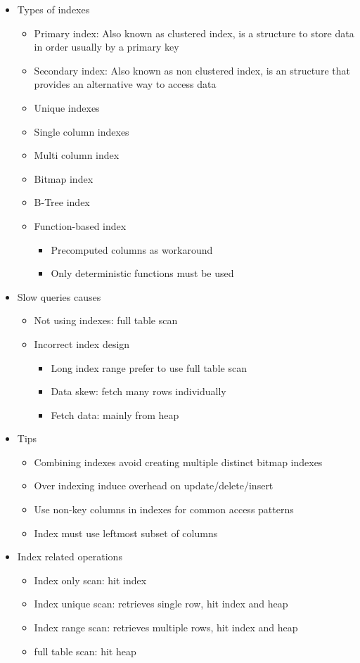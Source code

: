\documentclass[../../main.tex]{subfiles}
\begin{document}
\begin{itemize}
    \item Types of indexes
    \begin{itemize}
        \item Primary index: Also known as clustered index, is a structure to store data in order usually by a primary key
        \item Secondary index: Also known as non clustered index, is an structure that provides an alternative way to access data
        \item Unique indexes
        \item Single column indexes
        \item Multi column index
        \item Bitmap index
        \item B-Tree index
        \item Function-based index
        \begin{itemize}
            \item Precomputed columns as workaround
            \item Only deterministic functions must be used
        \end{itemize}
    \end{itemize}
    \item Slow queries causes
    \begin{itemize}
        \item Not using indexes: full table scan
        \item Incorrect index design
        \begin{itemize}
            \item Long index range prefer to use full table scan
            \item Data skew: fetch many rows individually
            \item Fetch data: mainly from heap
        \end{itemize}
    \end{itemize}
    \item Tips
    \begin{itemize}
        \item Combining indexes avoid creating multiple distinct bitmap indexes
        \item Over indexing induce overhead on update/delete/insert
        \item Use non-key columns in indexes for common access patterns
        \item Index must use leftmost subset of columns
    \end{itemize}
    \item Index related operations
    \begin{itemize}
        \item Index only scan: hit index
        \item Index unique scan: retrieves single row, hit index and heap
        \item Index range scan: retrieves multiple rows, hit index and heap
        \item full table scan: hit heap
    \end{itemize}
\end{itemize}
\end{document}
